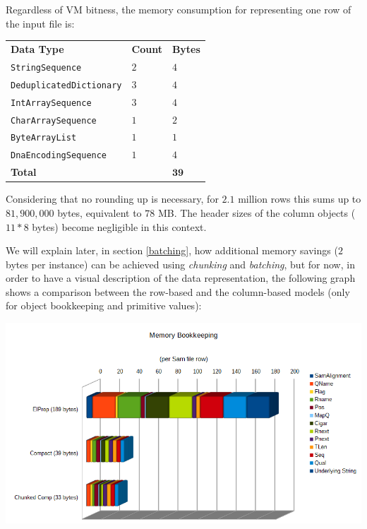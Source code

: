 \documentclass[a4paper,twoside]{article}
\begin{document}
Regardless of VM bitness, the memory consumption for representing one row of the input file is: 
\begin{center}
\begin{tabular}{ l l l }
 {\textbf{Data Type}} 				& {\textbf{Count}} 		& {\textbf{Bytes}} \\
 {\texttt{StringSequence}} 		& $2$ 				& $4$ \\
 {\texttt{DeduplicatedDictionary}}	& $3$ 				& $4$ \\
 {\texttt{IntArraySequence}}		& $3$		 		& $4$ \\
 {\texttt{CharArraySequence}}		& $1$				& $2$ \\
 {\texttt{ByteArrayList}}			& $1$				& $1$ \\
 {\texttt{DnaEncodingSequence}}	& $1$ 				& $4$ \\
 {\textbf{Total}}					& 					& $\mathbf{39}$
\end{tabular}
\end{center}

Considering that no rounding up is necessary, for $2.1$ million rows this sums up to $81,900,000$ bytes,
equivalent to $78$ MB. The header sizes of the column objects ($11*8$ bytes) become negligible in this context.

We will explain later, in section \ref{batching}, how additional memory savings ($2$ bytes per instance) can be achieved using {\it chunking} and {\it batching}, but for now, in order to have a visual description of the data representation, the following graph shows a comparison between the row-based and the column-based models (only for object bookkeeping and primitive values):

\begin{center}
	\includegraphics[scale=0.35]{images/MemoryBookeeping.png}
\end{center}
\end{document}
